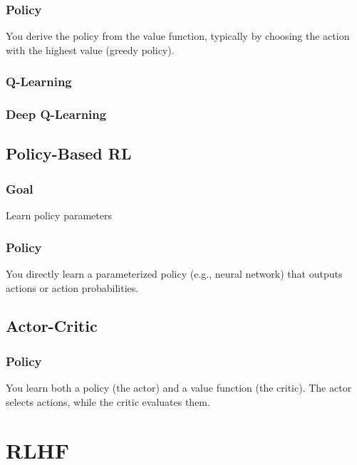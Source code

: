 \documentclass{article}
\begin{document}
\subsubsection{Policy} You derive the policy from the value function, typically by choosing the action with the highest value (greedy policy).

\subsubsection{Q-Learning}

\subsubsection{Deep Q-Learning}

\subsection{Policy-Based RL}

\subsubsection{Goal} Learn policy parameters

\subsubsection{Policy} You directly learn a parameterized policy (e.g., neural network) that outputs actions or action probabilities.

\subsection{Actor-Critic}

\subsubsection{Policy} You learn both a policy (the actor) and a value function (the critic). The actor selects actions, while the critic evaluates them.

\clearpage\newpage
\section{RLHF}
\end{document}
